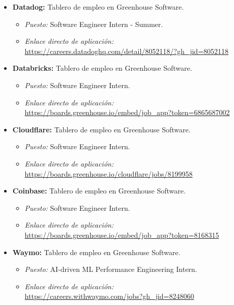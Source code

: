 \documentclass[12pt]{article}
\begin{document}
\begin{itemize}[leftmargin=0.2in, itemsep=0.3em]
    \item \textbf{Datadog:} Tablero de empleo en Greenhouse Software.
    \begin{itemize}[leftmargin=0.15in, noitemsep]
        \item \textit{Puesto:} Software Engineer Intern - Summer.
        \item \textit{Enlace directo de aplicación:}\\ {\small\url{https://careers.datadoghq.com/detail/8052118/?gh_jid=8052118}}
    \end{itemize}

    \item \textbf{Databricks:} Tablero de empleo en Greenhouse Software.
    \begin{itemize}[leftmargin=0.15in, noitemsep]
        \item \textit{Puesto:} Software Engineer Intern.
        \item \textit{Enlace directo de aplicación:}\\ {\small\url{https://boards.greenhouse.io/embed/job_app?token=6865687002}}
    \end{itemize}

    \item \textbf{Cloudflare:} Tablero de empleo en Greenhouse Software.
    \begin{itemize}[leftmargin=0.15in, noitemsep]
        \item \textit{Puesto:} Software Engineer Intern.
        \item \textit{Enlace directo de aplicación:}\\ {\small\url{https://boards.greenhouse.io/cloudflare/jobs/8199958}}
    \end{itemize}

    \item \textbf{Coinbase:} Tablero de empleo en Greenhouse Software.
    \begin{itemize}[leftmargin=0.15in, noitemsep]
        \item \textit{Puesto:} Software Engineer Intern.
        \item \textit{Enlace directo de aplicación:}\\ {\small\url{https://boards.greenhouse.io/embed/job_app?token=8168315}}
    \end{itemize}

    \item \textbf{Waymo:} Tablero de empleo en Greenhouse Software.
    \begin{itemize}[leftmargin=0.15in, noitemsep]
        \item \textit{Puesto:} AI-driven ML Performance Engineering Intern.
        \item \textit{Enlace directo de aplicación:}\\ {\small\url{https://careers.withwaymo.com/jobs?gh_jid=8248060}}
    \end{itemize}


\end{itemize}
\end{document}
